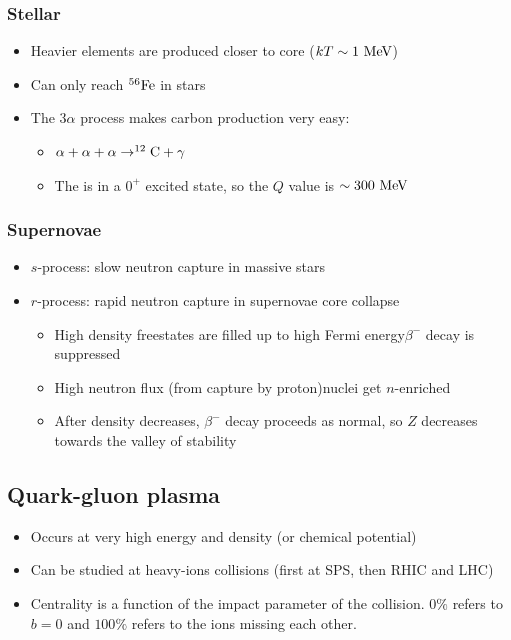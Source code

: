 \subsubsection{Stellar}
\begin{itemize}
  \item Heavier elements are produced closer to core ($kT\sim 1~\text{MeV}$)
  \item Can only reach $^{56}\text{Fe}$ in stars
  \item The $3\alpha$ process makes carbon production very easy:
  \begin{itemize}
    \item $\alpha+\alpha+\alpha \rightarrow ^{12}\text{C} + \gamma$
    \item The  is in a $0^+$ excited state, so the $Q$ value is $\sim300~\text{MeV}$
  \end{itemize}
\end{itemize}
\subsubsection{Supernovae}
\begin{itemize}
  \item $s$-process: slow neutron capture in massive stars
  \item $r$-process: rapid neutron capture in supernovae core collapse
  \begin{itemize}
    \item High density \thus free\el states are filled up to high Fermi energy\thus $\beta^-$ decay is suppressed
    \item High neutron flux (from \el capture by proton)\thus nuclei get $n$-enriched
    \item After density decreases, $\beta^-$ decay proceeds as normal, so $Z$ decreases towards the valley of stability
  \end{itemize}
\end{itemize}

\subsection{Quark-gluon plasma}
\begin{itemize}
  \item Occurs at very high energy and density (or chemical potential)
  \item Can be studied at heavy-ions collisions (first at SPS, then RHIC and LHC)
  \item Centrality is a function of the impact parameter of the collision. $0\%$ refers to $b=0$ and $100\%$ refers to the ions missing each other. 
\end{itemize}
